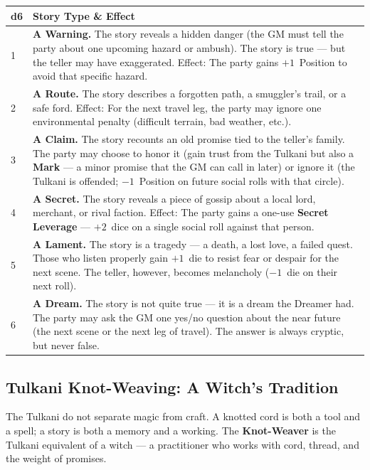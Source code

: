 \begin{longtable}{|p{}|p{}|}
\hline
\textbf{d6} & \textbf{Story Type \& Effect} \\
\hline
1 & \textbf{A Warning.} The story reveals a hidden danger (the GM must tell the party about one upcoming hazard or ambush). The story is true --- but the teller may have exaggerated. Effect: The party gains $+1$~Position to avoid that specific hazard. \\
\hline
2 & \textbf{A Route.} The story describes a forgotten path, a smuggler's trail, or a safe ford. Effect: For the next travel leg, the party may ignore one environmental penalty (difficult terrain, bad weather, etc.). \\
\hline
3 & \textbf{A Claim.} The story recounts an old promise tied to the teller's family. The party may choose to honor it (gain trust from the Tulkani but also a \textbf{Mark} --- a minor promise that the GM can call in later) or ignore it (the Tulkani is offended; $-1$~Position on future social rolls with that circle). \\
\hline
4 & \textbf{A Secret.} The story reveals a piece of gossip about a local lord, merchant, or rival faction. Effect: The party gains a one-use \textbf{Secret Leverage} --- $+2$~dice on a single social roll against that person. \\
\hline
5 & \textbf{A Lament.} The story is a tragedy --- a death, a lost love, a failed quest. Those who listen properly gain $+1$~die to resist fear or despair for the next scene. The teller, however, becomes melancholy ($-1$~die on their next roll). \\
\hline
6 & \textbf{A Dream.} The story is not quite true --- it is a dream the Dreamer had. The party may ask the GM one yes/no question about the near future (the next scene or the next leg of travel). The answer is always cryptic, but never false. \\
\hline
\end{longtable}

\subsection*{Tulkani Knot-Weaving: A Witch's Tradition}
\label{subsec:tulkani-knot-weaving}

The Tulkani do not separate magic from craft. A knotted cord is both a tool and a spell; a story is both a memory and a working. The \textbf{Knot-Weaver} is the Tulkani equivalent of a witch --- a practitioner who works with cord, thread, and the weight of promises.

